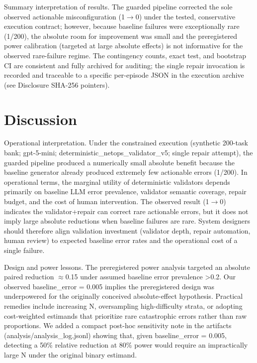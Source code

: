 \documentclass[conference]{IEEEtran}
\begin{document}
Summary interpretation of results. The guarded pipeline corrected the sole observed actionable misconfiguration (1\ensuremath{\rightarrow}0) under the tested, conservative execution contract; however, because baseline failures were exceptionally rare (1/200), the absolute room for improvement was small and the preregistered power calibration (targeted at large absolute effects) is not informative for the observed rare-failure regime. The contingency counts, exact test, and bootstrap CI are consistent and fully archived for auditing; the single repair invocation is recorded and traceable to a specific per-episode JSON in the execution archive (see Disclosure SHA-256 pointers).

\section{Discussion}
Operational interpretation. Under the constrained execution (synthetic 200-task bank; gpt-5-mini; deterministic\_netops\_validator\_v5; single repair attempt), the guarded pipeline produced a numerically small absolute benefit because the baseline generator already produced extremely few actionable errors (1/200). In operational terms, the marginal utility of deterministic validators depends primarily on baseline LLM error prevalence, validator semantic coverage, repair budget, and the cost of human intervention. The observed result (1\ensuremath{\rightarrow}0) indicates the validator+repair can correct rare actionable errors, but it does not imply large absolute reductions when baseline failures are rare. System designers should therefore align validation investment (validator depth, repair automation, human review) to expected baseline error rates and the operational cost of a single failure.

Design and power lessons. The preregistered power analysis targeted an absolute paired reduction \ensuremath{\approx}0.15 under assumed baseline error prevalence >0.2. Our observed baseline\_error = 0.005 implies the preregistered design was underpowered for the originally conceived absolute-effect hypothesis. Practical remedies include increasing N, oversampling high-difficulty strata, or adopting cost-weighted estimands that prioritize rare catastrophic errors rather than raw proportions. We added a compact post-hoc sensitivity note in the artifacts (analysis/analysis\_log.jsonl) showing that, given baseline\_error = 0.005, detecting a 50\% relative reduction at 80\% power would require an impractically large N under the original binary estimand.
\end{document}

